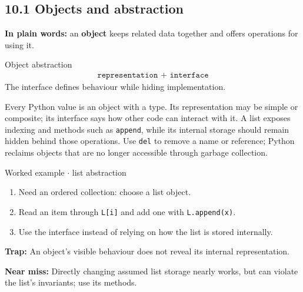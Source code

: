 \documentclass[11pt]{article}
\begin{document}
\begin{keepsection}
\section{10.1 Objects and abstraction}

\begin{plainbox}\textbf{In plain words:} an \textbf{object} keeps related data together and offers operations for using it.\end{plainbox}

\begin{equationcard}{Object abstraction}
\[ \begin{gathered} \texttt{representation + interface} \end{gathered} \]
{\small The interface defines behaviour while hiding implementation.}
\end{equationcard}

Every Python value is an object with a type. Its representation may be simple or composite; its interface says how other code can interact with it. A list exposes indexing and methods such as \texttt{append}, while its internal storage should remain hidden behind those operations. Use \texttt{del} to remove a name or reference; Python reclaims objects that are no longer accessible through garbage collection.

\begin{workedbox}{Worked example \ensuremath{\cdot} list abstraction}
\begin{enumerate}
\item Need an ordered collection: choose a list object.
\item Read an item through \texttt{L[i]} and add one with \texttt{L.append(x)}.
\item Use the interface instead of relying on how the list is stored internally.
\end{enumerate}
\end{workedbox}

\begin{notebox}\textbf{Trap:} An object’s visible behaviour does not reveal its internal representation.\end{notebox}

\begin{notebox}\textbf{Near miss:} Directly changing assumed list storage nearly works, but can violate the list’s invariants; use its methods.\end{notebox}


\end{keepsection}
\end{document}
